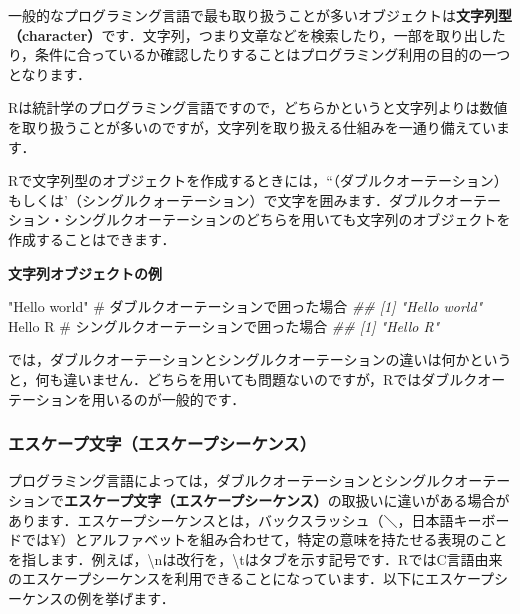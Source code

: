 \documentclass[
  letterpaper,
  DIV=11,
  numbers=noendperiod]{scrreprt}
\newenvironment{Shaded}{\begin{snugshade}}{\end{snugshade}}
\newcommand{\CommentTok}[1]{\textcolor[rgb]{0.37,0.37,0.37}{#1}}
\newcommand{\DocumentationTok}[1]{\textcolor[rgb]{0.37,0.37,0.37}{\textit{#1}}}
\newcommand{\StringTok}[1]{\textcolor[rgb]{0.13,0.47,0.30}{#1}}
\begin{document}
一般的なプログラミング言語で最も取り扱うことが多いオブジェクトは\textbf{文字列型（character）}です．文字列，つまり文章などを検索したり，一部を取り出したり，条件に合っているか確認したりすることはプログラミング利用の目的の一つとなります．

Rは統計学のプログラミング言語ですので，どちらかというと文字列よりは数値を取り扱うことが多いのですが，文字列を取り扱える仕組みを一通り備えています．

Rで文字列型のオブジェクトを作成するときには，``（ダブルクオーテーション）もしくは'（シングルクォーテーション）で文字を囲みます．ダブルクオーテーション・シングルクオーテーションのどちらを用いても文字列のオブジェクトを作成することはできます．

\textbf{文字列オブジェクトの例}

\begin{Shaded}
\begin{Highlighting}[]
\StringTok{"Hello world"} \CommentTok{\# ダブルクオーテーションで囲った場合}
\DocumentationTok{\#\# [1] "Hello world"}
\StringTok{\textquotesingle{}Hello R\textquotesingle{}} \CommentTok{\# シングルクオーテーションで囲った場合}
\DocumentationTok{\#\# [1] "Hello R"}
\end{Highlighting}
\end{Shaded}

では，ダブルクオーテーションとシングルクオーテーションの違いは何かというと，何も違いません．どちらを用いても問題ないのですが，Rではダブルクオーテーションを用いるのが一般的です．

\hypertarget{ux30a8ux30b9ux30b1ux30fcux30d7ux6587ux5b57ux30a8ux30b9ux30b1ux30fcux30d7ux30b7ux30fcux30b1ux30f3ux30b9}{%
\subsubsection{エスケープ文字（エスケープシーケンス）}\label{ux30a8ux30b9ux30b1ux30fcux30d7ux6587ux5b57ux30a8ux30b9ux30b1ux30fcux30d7ux30b7ux30fcux30b1ux30f3ux30b9}}

プログラミング言語によっては，ダブルクオーテーションとシングルクオーテーションで\textbf{エスケープ文字（エスケープシーケンス）}の取扱いに違いがある場合があります．エスケープシーケンスとは，バックスラッシュ（＼，日本語キーボードでは¥）とアルファベットを組み合わせて，特定の意味を持たせる表現のことを指します．例えば，\textbackslash nは改行を，\textbackslash tはタブを示す記号です．RではC言語由来のエスケープシーケンスを利用できることになっています．以下にエスケープシーケンスの例を挙げます．
\end{document}

